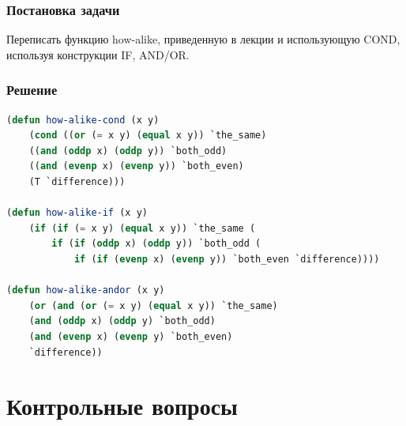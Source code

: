 \documentclass[12pt]{report}
\begin{document}
\subsection*{Постановка задачи}
Переписать функцию how-alike, приведенную в лекции и использующую COND, используя конструкции IF, AND/OR.

\subsection*{Решение}
\begin{lstlisting}[label=9,caption=Решение задания №9, language=lisp]
(defun how-alike-cond (x y)
	(cond ((or (= x y) (equal x y)) `the_same)
	((and (oddp x) (oddp y)) `both_odd)
	((and (evenp x) (evenp y)) `both_even)
	(T `difference)))

(defun how-alike-if (x y)
	(if (if (= x y) (equal x y)) `the_same (
		if (if (oddp x) (oddp y)) `both_odd (
			if (if (evenp x) (evenp y)) `both_even `difference))))

(defun how-alike-andor (x y)
	(or (and (or (= x y) (equal x y)) `the_same)
	(and (oddp x) (oddp y) `both_odd)
	(and (evenp x) (evenp y) `both_even)
	`difference))
\end{lstlisting}


	


\chapter*{Контрольные вопросы}
\end{document}
